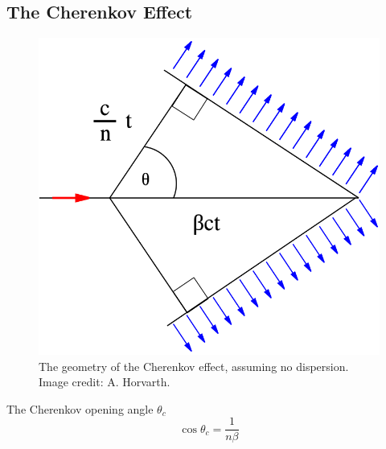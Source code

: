 \subsection{The Cherenkov Effect}

\begin{figure}[ht] 
        \centering \includegraphics[width=0.5\columnwidth]{figures/Cherenkov.png}

        \caption{
                \label{fig:cherenkov} %
                The geometry of the Cherenkov effect, assuming no dispersion. Image credit: A. Horvarth.
        }
\end{figure}
The Cherenkov opening angle $\theta_c$
\begin{equation}
    \cos\theta_c=\frac{1}{n\beta}
    \label{eq:cherenkov}
\end{equation}

